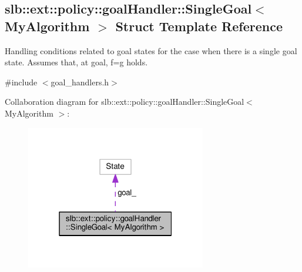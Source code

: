 \hypertarget{structslb_1_1ext_1_1policy_1_1goalHandler_1_1SingleGoal}{}\subsection{slb\+:\+:ext\+:\+:policy\+:\+:goal\+Handler\+:\+:Single\+Goal$<$ My\+Algorithm $>$ Struct Template Reference}
\label{structslb_1_1ext_1_1policy_1_1goalHandler_1_1SingleGoal}


Handling conditions related to goal states for the case when there is a single goal state. Assumes that, at goal, f=g holds.  




{\ttfamily \#include $<$goal\+\_\+handlers.\+h$>$}



Collaboration diagram for slb\+:\+:ext\+:\+:policy\+:\+:goal\+Handler\+:\+:Single\+Goal$<$ My\+Algorithm $>$\+:\nopagebreak
\begin{figure}[H]
\begin{center}
\leavevmode
\includegraphics[width=223pt]{structslb_1_1ext_1_1policy_1_1goalHandler_1_1SingleGoal__coll__graph}
\end{center}
\end{figure}
